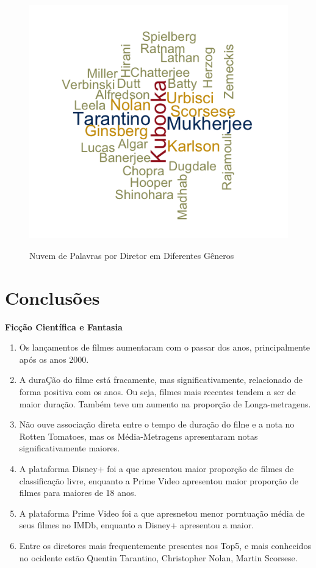\documentclass[a4paper, 12pt]{article} %
\begin{document}
\begin{figure}[H]
    \centering
    \caption{Nuvem de Palavras por Diretor em Diferentes Gêneros}
    \includegraphics[scale=1]{Nuvem.png}
    \label{fig:my_label}
\end{figure}

\pagebreak

\section{Conclusões}
\textbf{Ficção Científica e Fantasia}
\begin{enumerate}[topsep=0pt,partopsep=0pt]
    \item Os lançamentos de filmes aumentaram com o passar dos anos, principalmente após os anos 2000.
    \item A duraÇão do filme está fracamente, mas significativamente, relacionado de forma positiva com os anos. Ou seja, filmes mais recentes tendem a ser de maior duração. Também teve um aumento na proporção de Longa-metragens.  
    \item Não ouve associação direta entre o tempo de duração do filne e a nota no Rotten Tomatoes, mas os Média-Metragens apresentaram notas significativamente maiores. 
    \item A plataforma Disney+ foi a que apresentou maior proporção de filmes de classificação livre, enquanto a Prime Video apresentou maior proporção de filmes para maiores de 18 anos. 
    \item A plataforma Prime Video foi a que apresnetou menor porntuação média de seus filmes no IMDb, enquanto a Disney+ apresentou a maior. 
    \item Entre os diretores mais frequentemente presentes nos Top5, e mais conhecidos no ocidente estão Quentin Tarantino, Christopher Nolan, Martin Scorsese.
\end{enumerate}
\end{document}
